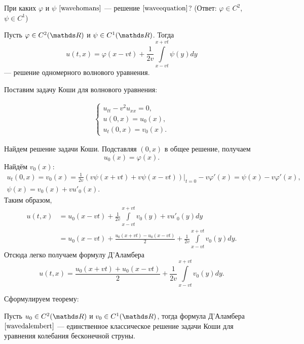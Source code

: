 \begin{exercise}
При каких $\varphi$ и $\psi$ $\eqref{wavehomans}$ --- решение $\eqref{waveequation}$? (Ответ: $\varphi \in C^2$, $\psi \in C^1$)
\end{exercise}

\begin{theorem} Пусть $\varphi \in C^2(\real)$ и $\psi \in C^1(\real)$. Тогда
$$ u(t, x) = \varphi (x - vt) + \frac {1} {2v} \int \limits_{x - vt}^{x+vt} \psi (y) dy$$
--- решение одномерного волнового уравнения.
\end{theorem}

Поставим задачу Коши для волнового уравнения:

\begin{align}
    \begin{cases} 
        u_{tt} - v^2 u_{xx} = 0, \\
        u (0, x) = u_0 (x), \\
        u_t(0,x) = v_0 (x).
    \end{cases}
\label{wavecauchy}
\end{align}

Найдем решение задачи Коши. Подставляя $(0,x)$ в общее решение, получаем $$ u_0(x) = \varphi(x) .$$ Найдём $v_0(x)$:
\begin{gather*}
	u_t(0,x) = v_0(x) = \frac {1} {2v} (v \psi (x + vt) + v \psi (x - vt)) \Bigg\rvert_{t = 0} - v \varphi' (x)
	= \psi(x) - v \varphi'(x), \\
	\psi(x) = v_0(x) + v u'_0(x).
\end{gather*}
Таким образом,
\begin{align*}
	u(t,x) &= u_0(x-vt) + \frac {1} {2v} \int \limits_{x-vt}^{x+vt} v_0(y) + vu'_0(y)dy \\
	&= u_0(x-vt) + \frac {u_0(x+vt) - u_0(x-vt)} { 2} + \frac {1} {2v} \int \limits_{x-vt}^{x+vt} v_0(y)dy.
\end{align*}
Отсюда легко получаем формулу Д'Аламбера
\begin{equation}
	u(t,x) = \frac {u_0(x+vt) + u_0(x-vt)} { 2} + \frac {1} {2v} \int \limits_{x-vt}^{x+vt} v_0(y)dy.
\label{wavedalembert}
\end{equation}

Сформулируем теорему:
\begin{theorem} Пусть $u_0 \in C^2(\real)$ и $v_0 \in C^1(\real)$, тогда формула Д'Аламбера $\eqref{wavedalembert}$ --- единственное классическое решение задачи Коши для уравнения колебания бесконечной струны.
\end{theorem}

